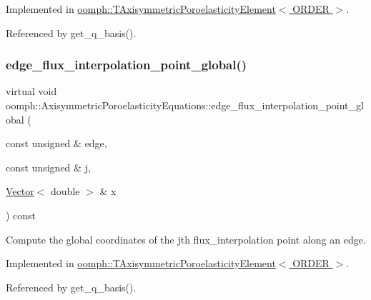 Implemented in \hyperlink{classoomph_1_1TAxisymmetricPoroelasticityElement_a2e9c7f4c54eb8e2ef7c1a6f7b058fc0a}{oomph\+::\+T\+Axisymmetric\+Poroelasticity\+Element$<$ O\+R\+D\+E\+R $>$}.



Referenced by get\+\_\+q\+\_\+basis().

\mbox{\label{classoomph_1_1AxisymmetricPoroelasticityEquations_a94eb24ad4a608057dd8601bbac14f241}} 
\subsubsection{\texorpdfstring{edge\+\_\+flux\+\_\+interpolation\+\_\+point\+\_\+global()}{edge\_flux\_interpolation\_point\_global()}}
{\footnotesize\ttfamily virtual void oomph\+::\+Axisymmetric\+Poroelasticity\+Equations\+::edge\+\_\+flux\+\_\+interpolation\+\_\+point\+\_\+global (\begin{DoxyParamCaption}\item[{const unsigned \&}]{edge,  }\item[{const unsigned \&}]{j,  }\item[{\hyperlink{classoomph_1_1Vector}{Vector}$<$ double $>$ \&}]{x }\end{DoxyParamCaption}) const\hspace{0.3cm}{\ttfamily [pure virtual]}}



Compute the global coordinates of the jth flux\+\_\+interpolation point along an edge. 



Implemented in \hyperlink{classoomph_1_1TAxisymmetricPoroelasticityElement_a06f4ef6b5eeb141500e04e14ae673c39}{oomph\+::\+T\+Axisymmetric\+Poroelasticity\+Element$<$ O\+R\+D\+E\+R $>$}.



Referenced by get\+\_\+q\+\_\+basis().

\mbox{\label{classoomph_1_1AxisymmetricPoroelasticityEquations_a737af4275bd48577f6ea4ca7cef1f73c}} 
